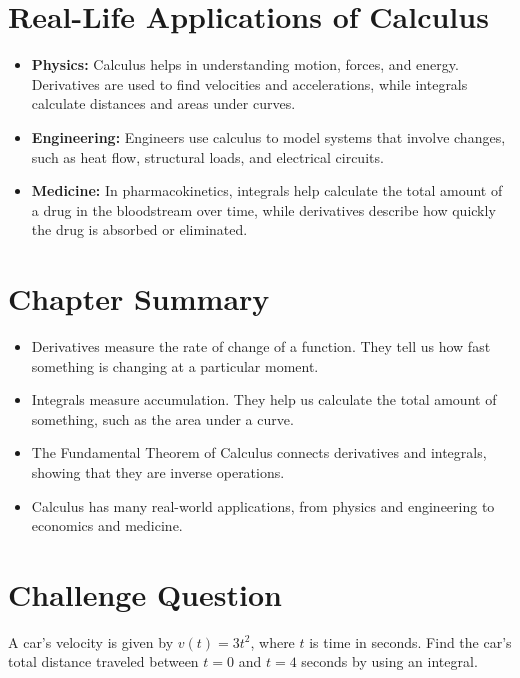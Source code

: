 \section{Real-Life Applications of Calculus}
\begin{itemize}
    \item \textbf{Physics:} Calculus helps in understanding motion, forces, and energy. Derivatives are used to find velocities and accelerations, while integrals calculate distances and areas under curves.
    \item \textbf{Engineering:} Engineers use calculus to model systems that involve changes, such as heat flow, structural loads, and electrical circuits.
    \item \textbf{Medicine:} In pharmacokinetics, integrals help calculate the total amount of a drug in the bloodstream over time, while derivatives describe how quickly the drug is absorbed or eliminated.
\end{itemize}

\section{Chapter Summary}
\begin{itemize}
    \item Derivatives measure the rate of change of a function. They tell us how fast something is changing at a particular moment.
    \item Integrals measure accumulation. They help us calculate the total amount of something, such as the area under a curve.
    \item The Fundamental Theorem of Calculus connects derivatives and integrals, showing that they are inverse operations.
    \item Calculus has many real-world applications, from physics and engineering to economics and medicine.
\end{itemize}

\section{Challenge Question}
A car’s velocity is given by \( v(t) = 3t^2 \), where \( t \) is time in seconds. Find the car’s total distance traveled between \( t = 0 \) and \( t = 4 \) seconds by using an integral.